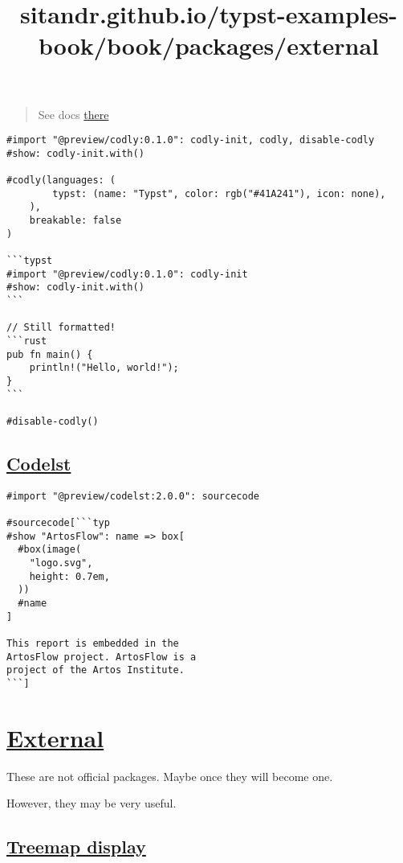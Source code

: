 \begin{quote}
See docs \href{https://github.com/Dherse/codly}{there}
\end{quote}

\begin{verbatim}
#import "@preview/codly:0.1.0": codly-init, codly, disable-codly
#show: codly-init.with()

#codly(languages: (
        typst: (name: "Typst", color: rgb("#41A241"), icon: none),
    ),
    breakable: false
)

```typst
#import "@preview/codly:0.1.0": codly-init
#show: codly-init.with()
```

// Still formatted!
```rust
pub fn main() {
    println!("Hello, world!");
}
```

#disable-codly()
\end{verbatim}

\pandocbounded{}

\subsection{\texorpdfstring{\hyperref[codelst]{Codelst}}{Codelst}}\label{codelst}

\begin{verbatim}
#import "@preview/codelst:2.0.0": sourcecode

#sourcecode[```typ
#show "ArtosFlow": name => box[
  #box(image(
    "logo.svg",
    height: 0.7em,
  ))
  #name
]

This report is embedded in the
ArtosFlow project. ArtosFlow is a
project of the Artos Institute.
```]
\end{verbatim}

\pandocbounded{}


\title{sitandr.github.io/typst-examples-book/book/packages/external}

\section{\texorpdfstring{\hyperref[external]{External}}{External}}\label{external}

These are not official packages. Maybe once they will become one.

However, they may be very useful.

\subsection{\texorpdfstring{\hyperref[treemap-display]{Treemap
display}}{Treemap display}}\label{treemap-display}

